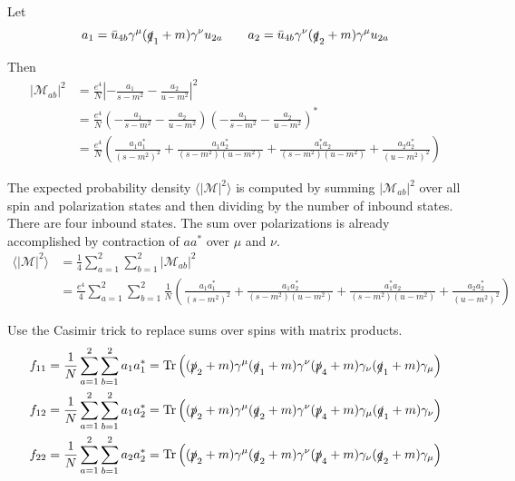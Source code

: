 \documentclass[12pt]{article}
\begin{document}
\bigskip
\noindent
Let
\begin{equation*}
a_1=\bar{u}_{4b}\gamma^\mu(\slashed{q}_1+m)\gamma^\nu u_{2a}
\qquad
a_2=\bar{u}_{4b}\gamma^\nu(\slashed{q}_2+m)\gamma^\mu u_{2a}
\end{equation*}

\noindent
Then
\begin{align*}
|\mathcal{M}_{ab}|^2&=\frac{e^4}{N}\left|-\frac{a_1}{s-m^2}-\frac{a_2}{u-m^2}\right|^2\\
&=
\frac{e^4}{N}
\left(-\frac{a_1}{s-m^2}-\frac{a_2}{u-m^2}\right)
\left(-\frac{a_1}{s-m^2}-\frac{a_2}{u-m^2}\right)^*\\
&=
\frac{e^4}{N}\left(
\frac{a_1a_1^*}{(s-m^2)^2}
+\frac{a_1a_2^*}{(s-m^2)(u-m^2)}
+\frac{a_1^*a_2}{(s-m^2)(u-m^2)}
+\frac{a_2a_2^*}{(u-m^2)^2}
\right)
\end{align*}

\noindent
The expected probability density $\langle|\mathcal{M}|^2\rangle$ is
computed by summing $|\mathcal{M}_{ab}|^2$ over all spin and polarization states
and then dividing by the number of inbound states.
There are four inbound states.
The sum over polarizations is already accomplished by contraction of $aa^*$ over $\mu$ and $\nu$.
\begin{align*}
\langle|\mathcal{M}|^2\rangle
&=\frac{1}{4}\sum_{a=1}^2\sum_{b=1}^2|\mathcal{M}_{ab}|^2\\
&=\frac{e^4}{4}\sum_{a=1}^2\sum_{b=1}^2
\frac{1}{N}\left(
\frac{a_1a_1^*}{(s-m^2)^2}
+\frac{a_1a_2^*}{(s-m^2)(u-m^2)}
+\frac{a_1^*a_2}{(s-m^2)(u-m^2)}
+\frac{a_2a_2^*}{(u-m^2)^2}
\right)
\end{align*}

\noindent
Use the Casimir trick to replace sums over spins with matrix products.
\begin{align*}
f_{11}&=\frac{1}{N} \sum_{a=1}^2\sum_{b=1}^2 a_1a_1^*=\mathop{\rm Tr}
\left(
(\slashed{p}_2+m)\gamma^\mu(\slashed{q}_1+m)\gamma^\nu(\slashed{p}_4+m)\gamma_\nu(\slashed{q}_1+m)\gamma_\mu
\right)
\\
f_{12}&=\frac{1}{N} \sum_{a=1}^2\sum_{b=1}^2 a_1a_2^*=\mathop{\rm Tr}
\left(
(\slashed{p}_2+m)\gamma^\mu(\slashed{q}_2+m)\gamma^\nu(\slashed{p}_4+m)\gamma_\mu(\slashed{q}_1+m)\gamma_\nu
\right)
\\
f_{22}&=\frac{1}{N} \sum_{a=1}^2\sum_{b=1}^2 a_2a_2^*=\mathop{\rm Tr}
\left(
(\slashed{p}_2+m)\gamma^\mu(\slashed{q}_2+m)\gamma^\nu(\slashed{p}_4+m)\gamma_\nu(\slashed{q}_2+m)\gamma_\mu
\right)
\end{align*}
\end{document}
